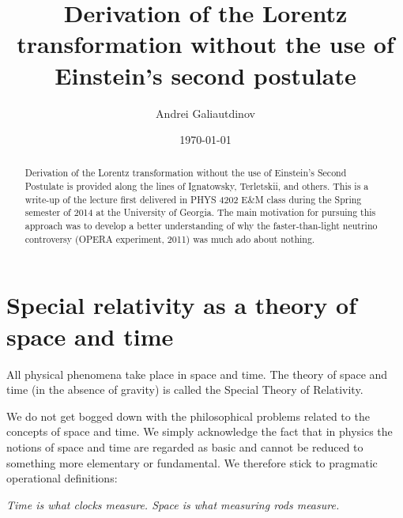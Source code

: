 \documentclass[twocolumn,preprintnumbers,amsmath,amssymb,final]{revtex4}
\begin{document}

\title{Derivation of the Lorentz transformation without the use of Einstein's second postulate}

\author{Andrei Galiautdinov}

\date{\today}%

\begin{abstract}

Derivation of the Lorentz transformation without the use of Einstein's Second Postulate 
is provided along the lines of Ignatowsky, Terletskii, and others. This is a write-up of the 
lecture first delivered in PHYS 4202 E\&M class during the Spring semester of 2014 at the University of Georgia. 
The main motivation for pursuing this approach was to develop a better understanding of why the 
faster-than-light neutrino controversy (OPERA experiment, 2011) was much ado about nothing.

\end{abstract}


\maketitle



\section*{Special relativity as a theory of space and time}

All physical phenomena take place in space and time. 
The theory of space and time (in the absence of gravity) 
is called the Special Theory of Relativity. 

We do not get bogged down with the philosophical problems related to the 
concepts of space and time. We simply 
acknowledge the fact that in physics the notions of space and time are 
regarded as basic and cannot be reduced 
to something more elementary or fundamental. We therefore stick to 
pragmatic operational definitions: 

{\it Time is what clocks measure. Space is what measuring rods measure.}
\end{document}
